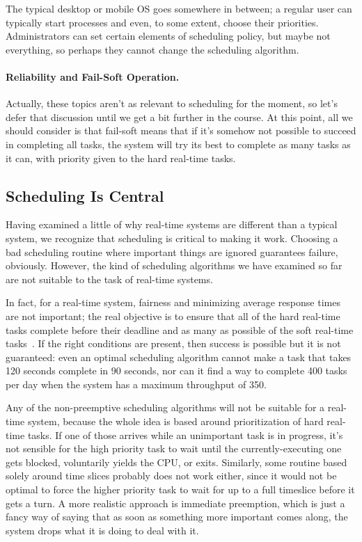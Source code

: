 The typical desktop or mobile OS goes somewhere in between; a regular user can typically start processes and even, to some extent, choose their priorities. Administrators can set certain elements of scheduling policy, but maybe not everything, so perhaps they cannot change the scheduling algorithm. 

\paragraph{Reliability and Fail-Soft Operation.} Actually, these topics aren't as relevant to scheduling for the moment, so let's defer that discussion until we get a bit further in the course. At this point, all we should consider is that fail-soft means that if it's somehow not possible to succeed in completing all tasks, the system will try its best to complete as many tasks as it can, with priority given to the hard real-time tasks.

\subsection*{Scheduling Is Central}
Having examined a little of why real-time systems are different than a typical system, we recognize that scheduling is critical to making it work. Choosing a bad scheduling routine where important things are ignored guarantees failure, obviously. However, the kind of scheduling algorithms we have examined so far are not suitable to the task of real-time systems.

In fact, for a real-time system, fairness and minimizing average response times are not important; the real objective is to ensure that all of the hard real-time tasks complete before their deadline and as many as possible of the soft real-time tasks~\cite{osi}. If the right conditions are present, then success is possible but it is not guaranteed: even an optimal scheduling algorithm cannot make a task that takes 120 seconds complete in 90 seconds, nor can it find a way to complete 400 tasks per day when the system has a maximum throughput of 350.

Any of the non-preemptive scheduling algorithms will not be suitable for a real-time system, because the whole idea is based around prioritization of hard real-time tasks. If one of those arrives while an unimportant task is in progress, it's not sensible for the high priority task to wait until the currently-executing one gets blocked, voluntarily yields the CPU, or exits. Similarly, some routine based solely around time slices probably does not work either, since it would not be optimal to force the higher priority task to wait for up to a full timeslice before it gets a turn. A more realistic approach is immediate preemption, which is just a fancy way of saying that as soon as something more important comes along, the system drops what it is doing to deal with it. 

